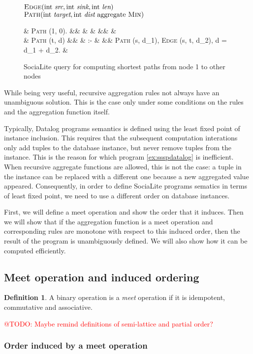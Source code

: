 \documentclass{pracamgr}
\makeatletter
\theoremstyle{plain}
\theoremstyle{definition}
\newtheorem{defn}{Definition}[section]
\theoremstyle{remark}
\newcommand{\todo}[1]{\textcolor{red}{@TODO: #1}}
\newcommand{\narrow}[1]{\begin{changemargin}{2cm}{2cm} #1 \end{changemargin}}
\makeatother
\begin{document}
\begin{figure}[h!]
\narrow{
  $\textsc{Edge}(\text{int } \textit{src}, \text{int } \textit{sink}, \text{int } \textit{len}) $ \\
  $\textsc{Path}(\text{int } \textit{target}, \text{int } \textit{dist} \text{ aggregate } \textsc{Min}) $
  \begin{flalign*}
  & \textsc{Path} (1, 0). &&  & & &&  & \\
  & \textsc{Path} (t, d) &&  & :- & && \textsc{Path} (s, d_1), \textsc{Edge} (s, t, d_2), d = d_1 + d_2. &
  \end{flalign*}
  \caption{SociaLite query for computing shortest paths from node 1 to other nodes}
}
\end{figure}

While being very useful, recursive aggregation rules not always have an unambiguous solution. This is the case only under some conditions on the rules and the aggregation function itself.

Typically, Datalog programs semantics is defined using the least fixed point of instance inclusion. This requires that the subsequent computation interations only add tuples to the database instance, but never remove tuples from the instance. This is the reason for which program \ref{ex:ssspdatalog} is inefficient. When recursive aggregate functions are allowed, this is not the case: a tuple in the instance can be replaced with a different one because a new aggregated value appeared. Consequently, in order to define SociaLite programs sematics in terms of least fixed point, we need to use a different order on database instances.

First, we will define a meet operation and show the order that it induces. Then we will show that if the aggregation function is a meet operation and corresponding rules are monotone with respect to this induced order, then the result of the program is unambiguously defined. We will also show how it can be computed efficiently.

\subsection{Meet operation and induced ordering}
\begin{defn}
A binary operation is a \emph{meet} operation if it is idempotent, commutative and associative.
\end{defn}
\todo{Maybe remind definitions of semi-lattice and partial order?}

\subsubsection{Order induced by a meet operation}
\end{document}
